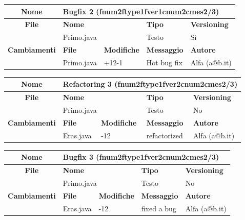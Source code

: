 \begin{table}[ht]
\footnotesize
\begin{tabular}{|c|p{2.5cm}|p{2cm}|p{2.5cm}|p{2.5cm}|}
  \hline
  \textbf{Nome}	& \multicolumn{4}{l|}{Bugfix 2 (fnum2ftype1fver1cnum2cmes2/3)} 										\\
  \hline
  \rowcolor{lightgray}\textbf{File} 		& \multicolumn{2}{l|}{\textbf{Nome}}		& \textbf{Tipo}		& \textbf{Versioning} 		\\
						\cline{2-5}
						& \multicolumn{2}{l|}{Primo.java}		& Testo			& Sì				\\
  \hline
  \rowcolor{lightgray}\textbf{Cambiamenti}	& \textbf{File}		&\textbf{Modifiche}	& \textbf{Messaggio}	& \textbf{Autore}		\\
						\cline{2-5}
						& Primo.java		& +12-1	 		& Hot bug fix		& Alfa (a@b.it)			\\
						
  \hline
\end{tabular}
\end{table}



\begin{table}[ht]
\footnotesize
\begin{tabular}{|c|p{2.5cm}|p{2cm}|p{2.5cm}|p{2.5cm}|}
  \hline
  \textbf{Nome}	& \multicolumn{4}{l|}{Refactoring 3 (fnum2ftype1fver2cnum2cmes2/3)}									\\
  \hline
  \rowcolor{lightgray}\textbf{File} 		& \multicolumn{2}{l|}{\textbf{Nome}}		& \textbf{Tipo}		& \textbf{Versioning} 		\\
						\cline{2-5}
						& \multicolumn{2}{l|}{Primo.java}		& Testo			& No				\\
  \hline
  \rowcolor{lightgray}\textbf{Cambiamenti}	& \textbf{File}		&\textbf{Modifiche}	& \textbf{Messaggio}	& \textbf{Autore}		\\
						\cline{2-5}
						& Eras.java		& -12	  		& refactorized		& Alfa (a@b.it)			\\
						
  \hline
\end{tabular}
\end{table}

\begin{table}[ht]
\footnotesize
\begin{tabular}{|c|p{2.5cm}|p{2cm}|p{2.5cm}|p{2.5cm}|}
  \hline
  \textbf{Nome}	& \multicolumn{4}{l|}{Bugfix 3 (fnum2ftype1fver2cnum2cmes2/3)}										\\
  \hline
  \rowcolor{lightgray}\textbf{File} 		& \multicolumn{2}{l|}{\textbf{Nome}}		& \textbf{Tipo}		& \textbf{Versioning} 		\\
						\cline{2-5}
						& \multicolumn{2}{l|}{Primo.java}		& Testo			& No				\\
  \hline
  \rowcolor{lightgray}\textbf{Cambiamenti}	& \textbf{File}		&\textbf{Modifiche}	& \textbf{Messaggio}	& \textbf{Autore}		\\
						\cline{2-5}
						& Eras.java		& -12	  		& fixed a bug		& Alfa (a@b.it)			\\
						
  \hline
\end{tabular}
\end{table}


